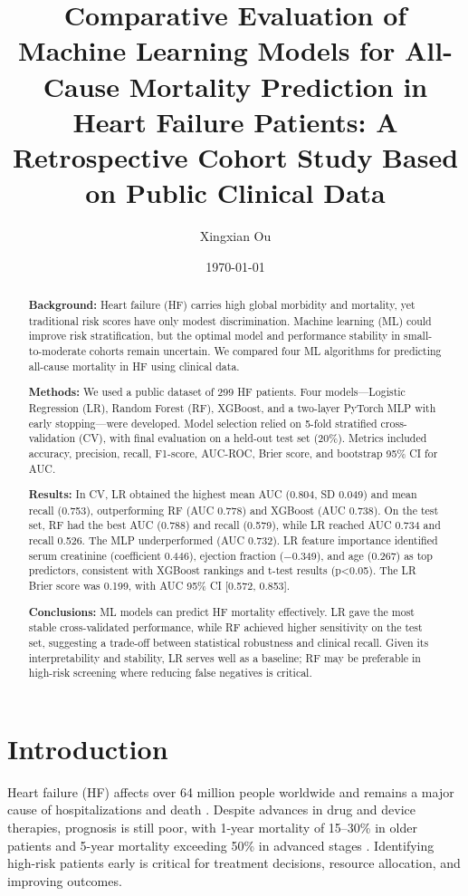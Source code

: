 \documentclass[12pt,a4paper]{article}
\title{Comparative Evaluation of Machine Learning Models for All-Cause Mortality Prediction in Heart Failure Patients: A Retrospective Cohort Study Based on Public Clinical Data}
\author{Xingxian Ou}
\date{\today}
\begin{document}
\maketitle

\begin{abstract}
\textbf{Background:} Heart failure (HF) carries high global morbidity and mortality, yet traditional risk scores have only modest discrimination. Machine learning (ML) could improve risk stratification, but the optimal model and performance stability in small-to-moderate cohorts remain uncertain. We compared four ML algorithms for predicting all-cause mortality in HF using clinical data.

\textbf{Methods:} We used a public dataset of 299 HF patients. Four models—Logistic Regression (LR), Random Forest (RF), XGBoost, and a two-layer PyTorch MLP with early stopping—were developed. Model selection relied on 5-fold stratified cross-validation (CV), with final evaluation on a held-out test set (20\%). Metrics included accuracy, precision, recall, F1-score, AUC-ROC, Brier score, and bootstrap 95\% CI for AUC.

\textbf{Results:} In CV, LR obtained the highest mean AUC (0.804, SD 0.049) and mean recall (0.753), outperforming RF (AUC 0.778) and XGBoost (AUC 0.738). On the test set, RF had the best AUC (0.788) and recall (0.579), while LR reached AUC 0.734 and recall 0.526. The MLP underperformed (AUC 0.732). LR feature importance identified serum creatinine (coefficient 0.446), ejection fraction ($-$0.349), and age (0.267) as top predictors, consistent with XGBoost rankings and t-test results (p<0.05). The LR Brier score was 0.199, with AUC 95\% CI [0.572, 0.853].

\textbf{Conclusions:} ML models can predict HF mortality effectively. LR gave the most stable cross-validated performance, while RF achieved higher sensitivity on the test set, suggesting a trade-off between statistical robustness and clinical recall. Given its interpretability and stability, LR serves well as a baseline; RF may be preferable in high-risk screening where reducing false negatives is critical.
\end{abstract}

\section{Introduction}

Heart failure (HF) affects over 64 million people worldwide and remains a major cause of hospitalizations and death \cite{savarese2022global}. Despite advances in drug and device therapies, prognosis is still poor, with 1-year mortality of 15–30\% in older patients and 5-year mortality exceeding 50\% in advanced stages \cite{ponikowski2016esc}. Identifying high-risk patients early is critical for treatment decisions, resource allocation, and improving outcomes.
\end{document}
